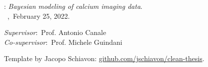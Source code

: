 \thispagestyle{empty}

\hfill

\vfill

\noindent\myName: \emph{Bayesian modeling of calcium imaging data}.\\
\textcopyright~\myLocation,~February 25, 2022.

\medskip
%
\noindent\textit{Supervisor}:~Prof. Antonio Canale \\
\noindent\textit{Co-supervisor}:~Prof. Michele Guindani \\

\medskip

\noindent Template by Jacopo Schiavon: \href{https://github.com/jschiavon/clean-thesis}{github.com/jschiavon/clean-thesis}.